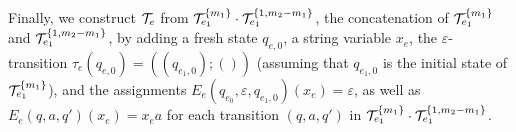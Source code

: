 Finally, we construct $\mathcal{T}_e$ from $\mathcal{T}^{\{m_1\}}_{e_1} \cdot \mathcal{T}^{\{1,m_2-m_1\}}_{e_1}$, the concatenation of $\mathcal{T}^{\{m_1\}}_{e_1}$ and $\mathcal{T}^{\{1,m_2-m_1\}}_{e_1}$, by adding a fresh state $q_{e,0}$, a string variable $x_e$, the $\varepsilon$-transition $\tau_e(q_{e,0}) = ((q_{e_1,0});())$ (assuming that $q_{e_1,0}$ is the initial state of $\mathcal{T}^{\{m_1\}}_{e_1}$),  and the assignments $E_e(q_{e_0}, \varepsilon, q_{e_1,0})(x_e) = \varepsilon$, as well as $E_e(q, a, q')(x_e) = x_e a$ for each transition $(q, a, q')$ in  $\mathcal{T}^{\{m_1\}}_{e_1} \cdot \mathcal{T}^{\{1,m_2-m_1\}}_{e_1}$.

%
%		
%
% 
